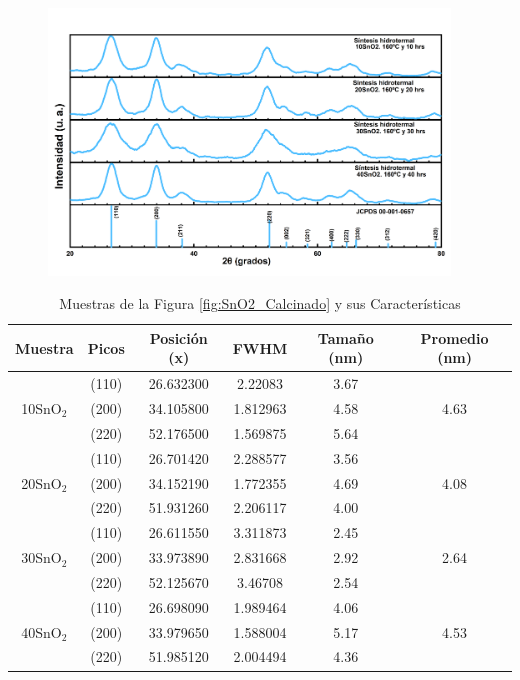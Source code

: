 \documentclass[12pt]{article}
\begin{document}
\begin{figure}[H]
    	   \begin{center}
     	  	\includegraphics[width = 0.95\textwidth]{Imagenes/SnO2_Calcinado.png}
    	   \end{center} 
        \end{figure}



\begin{table}[h!]
\caption{Muestras de la Figura \ref{fig:SnO2_Calcinado} y sus Características}
  \centering
  \begin{tabular}{|c|c|c|c|c|c|}
    \hline
    Muestra & Picos & Posición (x) & FWHM & Tamaño (nm) & Promedio (nm)\\
    \hline
    & (110) & 26.632300 & 2.22083 & 3.67 & \\
    10SnO$_{2}$ & (200) & 34.105800 & 1.812963 & 4.58 & \textcolor[rgb]{0.29,0.82,0.89}{4.63}\\
    & (220) & 52.176500 & 1.569875 & 5.64 & \\
    \hline
    & (110) & 26.701420 & 2.288577 & 3.56 & \\
    20SnO$_{2}$ & (200) & 34.152190 & 1.772355 & 4.69 & \textcolor[rgb]{0.29,0.82,0.89}{4.08}\\
    & (220) & 51.931260 & 2.206117 & 4.00 & \\
    \hline
    & (110) & 26.611550 & 3.311873 & 2.45 & \\
    30SnO$_{2}$ & (200) & 33.973890 & 2.831668 & 2.92 & \textcolor[rgb]{0.29,0.82,0.89}{2.64}\\
    & (220) & 52.125670 & 3.46708 & 2.54 & \\
    \hline
    & (110) & 26.698090 & 1.989464 & 4.06 & \\
    40SnO$_{2}$ & (200) & 33.979650 & 1.588004 & 5.17 & \textcolor[rgb]{0.29,0.82,0.89}{4.53}\\
    & (220) & 51.985120 & 2.004494 & 4.36 & \\
    \hline
  \end{tabular}
  \label{tab:mi_drx3}
\end{table}
\end{document}
